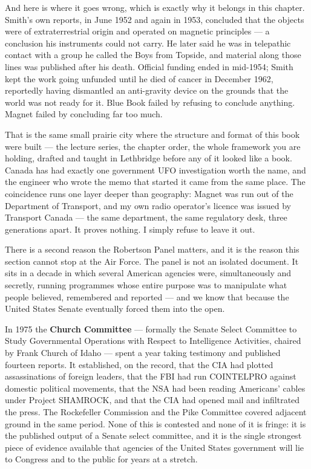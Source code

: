 And here is where it goes wrong, which is exactly why it belongs in this chapter. Smith's own
reports, in June 1952 and again in 1953, concluded that the objects were of extraterrestrial
origin and operated on magnetic principles --- a conclusion his instruments could not carry. He
later said he was in telepathic contact with a group he called the Boys from Topside, and
material along those lines was published after his death. Official funding ended in mid-1954;
Smith kept the work going unfunded until he died of cancer in December 1962, reportedly having
dismantled an anti-gravity device on the grounds that the world was not ready for it. Blue Book
failed by refusing to conclude anything. Magnet failed by concluding far too much. 

\begin{funfact}
That is the same small prairie city where the structure and format of this book were built ---
the lecture series, the chapter order, the whole framework you are holding, drafted and taught
in Lethbridge before any of it looked like a book. Canada has had exactly one government UFO
investigation worth the name, and the engineer who wrote the memo that started it came from the
same place. The coincidence runs one layer deeper than geography: Magnet was run out of the
Department of Transport, and my own radio operator's licence was issued by Transport Canada ---
the same department, the same regulatory desk, three generations apart. It proves nothing. I
simply refuse to leave it out.
\end{funfact}

There is a second reason the Robertson Panel matters, and it is the reason this section cannot
stop at the Air Force. The panel is not an isolated document. It sits in a decade in which
several American agencies were, simultaneously and secretly, running programmes whose entire
purpose was to manipulate what people believed, remembered and reported --- and we know that
because the United States Senate eventually forced them into the open.

In 1975 the \textbf{Church Committee} --- formally the Senate Select Committee to Study
Governmental Operations with Respect to Intelligence Activities, chaired by Frank Church of
Idaho --- spent a year taking testimony and published fourteen reports. It established, on the
record, that the CIA had plotted assassinations of foreign leaders, that the FBI had run
COINTELPRO against domestic political movements, that the NSA had been reading Americans'
cables under Project SHAMROCK, and that the CIA had opened mail and infiltrated the press. The
Rockefeller Commission and the Pike Committee covered adjacent ground in the same period. None
of this is contested and none of it is fringe: it is the published output of a Senate select
committee, and it is the single strongest piece of evidence available that agencies of the
United States government will lie to Congress and to the public for years at a stretch.

